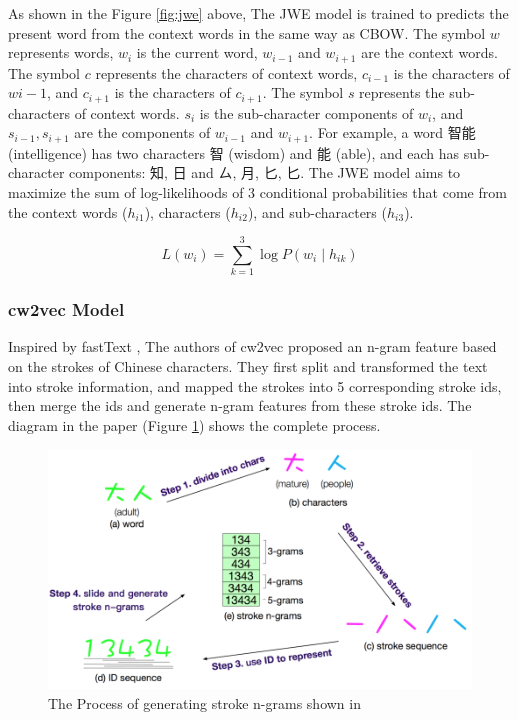 As shown in the Figure \ref{fig:jwe} above, The JWE model is trained to predicts the present word from the context words in the same way as CBOW. The symbol $w$ represents words, $w_i$ is the current word, $w_{i-1}$ and $w_{i+1}$ are the context words. The symbol $c$ represents the characters of context words, $c_{i-1}$ is the characters of $w{i-1}$, and $c_{i+1}$ is the characters of $c_{i+1}$. The symbol $s$ represents the sub-characters of context words. $s_i$ is the sub-character components of $w_i$, and $s_{i-1}, s_{i+1}$ are the components of $w_{i-1}$ and $w_{i+1}$. For example, a word 智能 (intelligence) has two characters 智 (wisdom) and 能 (able), and each has sub-character components: 知, 日 and ㄙ, 月, 匕, 匕. The JWE model aims to maximize the sum of log-likelihoods of 3 conditional probabilities that come from the context words ($h_{i1}$), characters ($h_{i2}$), and sub-characters ($h_{i3}$).

\begin{equation}
L(w_i) = \sum_{k=1}^3\log P(w_i\mid h_{ik})    
\end{equation}

\subsubsection{cw2vec Model}

Inspired by fastText \cite{bojanowski2017enriching}, The authors of cw2vec \cite{cao2018cw2vec} proposed an n-gram feature based on the strokes of Chinese characters. They first split and transformed the text into stroke information, and mapped the strokes into 5 corresponding stroke ids, then merge the ids and generate n-gram features from these stroke ids. The diagram in the paper (Figure \ref{fig:cw2vec1}) shows the complete process.

\begin{figure}[h]
	\centering
	\includegraphics[scale=0.6]{../images/cw2vec_illustration1.png}
	\caption{The Process of generating stroke n-grams shown in \cite{cao2018cw2vec}}
	\label{fig:cw2vec1}
\end{figure}

